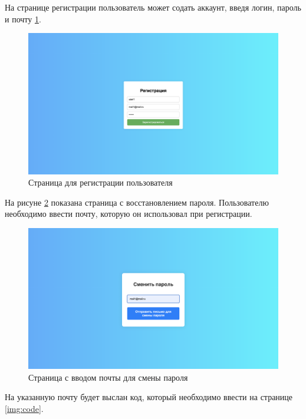 На странице регистрации пользователь может содать аккаунт, введя логин, пароль и почту \ref{img:reg}.
\begin{figure}[H]
    \includegraphics[width=1\linewidth]{img/reg.png}
    \caption{\label{img:reg} Страница для регистрации пользователя}
\end{figure}
\noindent

На рисуне \ref{img:passw} показана страница с восстановлением пароля. Пользователю необходимо ввести почту, которую он использовал при 
регистрации. 

\begin{figure}[H]
    \includegraphics[width=1\linewidth]{img/passw.png}
    \caption{\label{img:passw} Страница с вводом почты для смены пароля}
\end{figure}
\noindent

На указанную почту будет выслан код, который необходимо ввести на странице \ref{img:code}.


